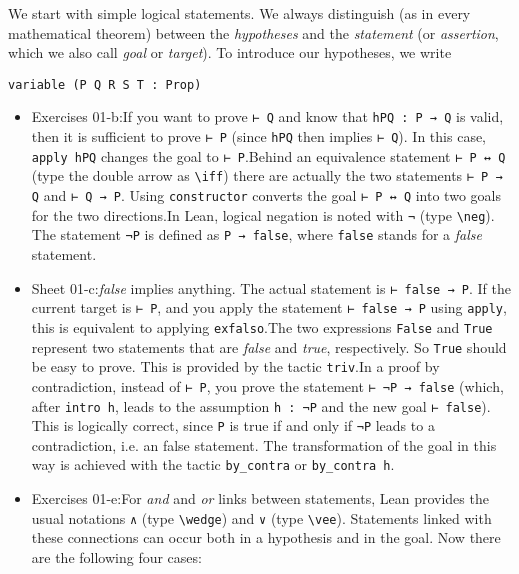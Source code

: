 \documentclass{memoir}
\begin{document}
We start with simple logical statements. We always distinguish (as in every mathematical theorem) between the \emph{hypotheses} and the \emph{statement} (or \emph{assertion}, which we also call \emph{goal} or \emph{target}). To introduce our hypotheses, we write

\begin{verbatim}
variable (P Q R S T : Prop)

\end{verbatim}



\begin{itemize}
\item Exercises 01-b:If you want to prove \Verb|⊢ Q| and know that \Verb|hPQ : P → Q| is valid, then it is sufficient to prove \Verb|⊢ P| (since \Verb|hPQ| then implies \Verb|⊢ Q|). In this case, \Verb|apply hPQ| changes the goal to \Verb|⊢ P|.Behind an equivalence statement \Verb|⊢ P ↔ Q| (type the double arrow as \Verb|\iff|) there are actually the two statements \Verb|⊢ P → Q| and \Verb|⊢ Q → P|. Using \Verb|constructor| converts the goal \Verb|⊢ P ↔ Q| into two goals for the two directions.In Lean, logical negation is noted with \Verb|¬| (type \Verb|\neg|). The statement \Verb|¬P| is defined as \Verb|P → false|, where \Verb|false| stands for a \emph{false} statement.\item Sheet 01-c:\emph{false} implies anything. The actual statement is \Verb|⊢ false → P|. If the current target is \Verb|⊢ P|, and you apply the statement \Verb|⊢ false → P| using \Verb|apply|, this is equivalent to applying \Verb|exfalso|.The two expressions \Verb|False| and \Verb|True| represent two statements that are \emph{false} and \emph{true}, respectively. So \Verb|True| should be easy to prove. This is provided by the tactic \Verb|triv|.In a proof by contradiction, instead of \Verb|⊢ P|, you prove the statement \Verb|⊢ ¬P → false| (which, after \Verb|intro h|, leads to the assumption \Verb|h : ¬P| and the new goal \Verb|⊢ false|). This is logically correct, since \Verb|P| is true if and only if \Verb|¬P| leads to a contradiction, i.e. an false statement. The transformation of the goal in this way is achieved with the tactic \Verb|by_contra| or \Verb|by_contra h|.\item Exercises 01-e:For \emph{and} and \emph{or} links between statements, Lean provides the usual notations \Verb|∧| (type \Verb|\wedge|) and \Verb|∨| (type \Verb|\vee|). Statements linked with these connections can occur both in a hypothesis and in the goal. Now there are the following four cases:\begin{itemize}

\end{itemize}
\end{itemize}
\end{document}
